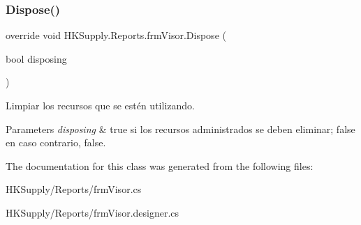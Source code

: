 \subsubsection{\texorpdfstring{Dispose()}{Dispose()}}
{\footnotesize\ttfamily override void H\+K\+Supply.\+Reports.\+frm\+Visor.\+Dispose (\begin{DoxyParamCaption}\item[{bool}]{disposing }\end{DoxyParamCaption})\hspace{0.3cm}{\ttfamily [protected]}}



Limpiar los recursos que se estén utilizando. 


\begin{DoxyParams}{Parameters}
{\em disposing} & true si los recursos administrados se deben eliminar; false en caso contrario, false.\\
\hline
\end{DoxyParams}


The documentation for this class was generated from the following files\+:\begin{DoxyCompactItemize}
\item 
H\+K\+Supply/\+Reports/frm\+Visor.\+cs\item 
H\+K\+Supply/\+Reports/frm\+Visor.\+designer.\+cs\end{DoxyCompactItemize}
